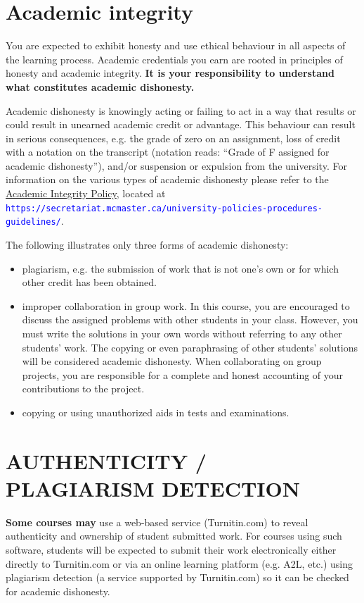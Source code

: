\documentclass[12pt]{article}
\newcommand{\url}[1]{{\tt\textcolor{blue}{#1}}}
\begin{document}
\section*{Academic integrity}

You are expected to exhibit honesty and use ethical behaviour in all
aspects of the learning process. Academic credentials you earn are
rooted in principles of honesty and academic integrity. \textbf{It is
your responsibility to understand what constitutes academic dishonesty.}

Academic dishonesty is knowingly acting or failing to act in a way that results or could result in unearned academic credit or advantage. This behaviour can result in serious consequences, e.g. the grade of zero on an assignment, loss of credit with a notation on the transcript (notation reads: ``Grade of F assigned for academic dishonesty''), and/or suspension or expulsion from the university. For information on the various types of academic dishonesty please refer to the \href{https://secretariat.mcmaster.ca/app/uploads/Academic-Integrity-Policy-1-1.pdf}{Academic Integrity Policy}, located at \url{https://secretariat.mcmaster.ca/university-policies-procedures-guidelines/}.

The following illustrates only three forms of academic dishonesty:

\begin{itemize}
\item
  plagiarism, e.g. the submission of work that is not one's own or for
  which other credit has been obtained.
\item
  improper collaboration in group work. In this course, you are encouraged to discuss the assigned problems with other students in your class. However, you must write the solutions in your own words without referring to any other students' work. The copying or even paraphrasing of other students' solutions will be considered academic dishonesty. When collaborating on group projects, you are responsible for a complete and honest accounting of your contributions to the project.
\item
  copying or using unauthorized aids in tests and examinations.
\end{itemize}


\section*{AUTHENTICITY / PLAGIARISM DETECTION}

\textbf{Some courses may} use a web-based service (Turnitin.com)
to reveal authenticity and ownership of student submitted work. For
courses using such software, students will be expected to submit their
work electronically either directly to Turnitin.com or via an online
learning platform (e.g. A2L, etc.) using plagiarism detection (a service
supported by Turnitin.com) so it can be checked for academic dishonesty.
\end{document}
